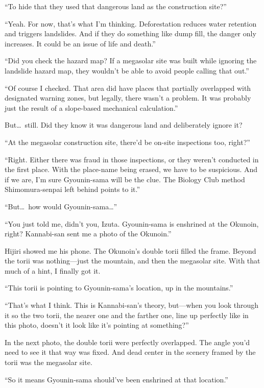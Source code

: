 \documentclass[
    a4paper,
    12pt,
    twoside,
    openany,
    UTF8,
    fontset=windows
]{ctexbook}
\begin{document}
``To hide that they used that dangerous land as the construction site?''

``Yeah. For now, that's what I'm thinking. Deforestation reduces water retention and triggers landslides. And if they do something like dump fill, the danger only increases. It could be an issue of life and death.''

``Did you check the hazard map? If a megasolar site was built while ignoring the landslide hazard map, they wouldn't be able to avoid people calling that out.''

``Of course I checked. That area did have places that partially overlapped with designated warning zones, but legally, there wasn't a problem. It was probably just the result of a slope-based mechanical calculation.''

But\dots\ still. Did they know it was dangerous land and deliberately ignore it?

``At the megasolar construction site, there'd be on-site inspections too, right?''

``Right. Either there was fraud in those inspections, or they weren't conducted in the first place. With the place-name being erased, we have to be suspicious. And if we are, I'm sure Gyounin-sama will be the clue. The Biology Club method Shimomura-senpai left behind points to it.''

``But\dots\ how would Gyounin-sama\dots''

``You just told me, didn't you, Izuta. Gyounin-sama is enshrined at the Okunoin, right? Kannabi-san sent me a photo of the Okunoin.''

Hijiri showed me his phone. The Okunoin's double torii filled the frame. Beyond the torii was nothing---just the mountain, and then the megasolar site. With that much of a hint, I finally got it.

``This torii is pointing to Gyounin-sama's location, up in the mountains.''

``That's what I think. This is Kannabi-san's theory, but---when you look through it so the two torii, the nearer one and the farther one, line up perfectly like in this photo, doesn't it look like it's pointing at something?''

In the next photo, the double torii were perfectly overlapped. The angle you'd need to see it that way was fixed. And dead center in the scenery framed by the torii was the megasolar site.

``So it means Gyounin-sama should've been enshrined at that location.''
\end{document}
